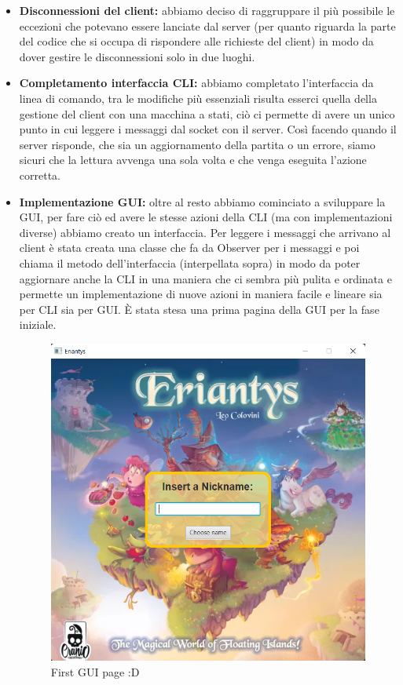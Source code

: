 \documentclass[a4paper, 12pt]{article}
\begin{document}
	\begin{itemize}
		\item \textbf{Disconnessioni del client:} abbiamo deciso di raggruppare il più possibile le eccezioni che potevano essere lanciate dal server (per quanto riguarda la parte del codice che si occupa di rispondere alle richieste del client) in modo da dover gestire le disconnessioni solo in due luoghi.
		\item \textbf{Completamento interfaccia CLI:} abbiamo completato l'interfaccia da linea di comando, tra le modifiche più essenziali risulta esserci quella della gestione del client con una macchina a stati, ciò ci permette di avere un unico punto in cui leggere i messaggi dal socket con il server. Così facendo quando il server risponde, che sia un aggiornamento della partita o un errore, siamo sicuri che la lettura avvenga una sola volta e che venga eseguita l'azione corretta.
		\item \textbf{Implementazione GUI:} oltre al resto abbiamo cominciato a sviluppare la GUI, per fare ciò ed avere le stesse azioni della CLI (ma con implementazioni diverse) abbiamo creato un interfaccia. 
		Per leggere i messaggi che arrivano al client è stata creata una classe che fa da Observer per i messaggi e poi chiama il metodo dell'interfaccia (interpellata sopra) in modo da poter aggiornare anche la CLI in una maniera che ci sembra più pulita e ordinata e permette un implementazione di nuove azioni in maniera facile e lineare sia per CLI sia per GUI. 
		È stata stesa una prima pagina della GUI per la fase iniziale.
		\begin{figure}[h!]
			\centering
			\includegraphics[scale=0.45]{first_GUI_page.png}
			\caption{First GUI page :D}
		\end{figure}
	\end{itemize}
\end{document}
